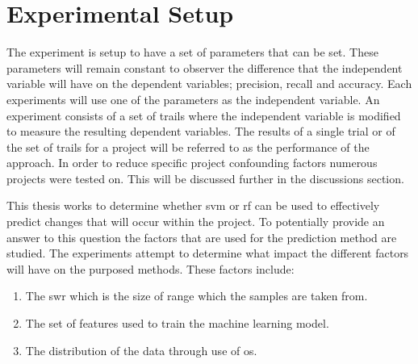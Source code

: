 





\section{Experimental Setup}


The experiment is setup to have a set of parameters that can be set. These parameters will remain constant to observer the difference that the independent variable will have on the dependent variables; precision, recall and accuracy. Each experiments will use one of the parameters as the independent variable. An experiment consists of a set of trails where the independent variable is modified to measure the resulting dependent variables. The results of a single trial or of the set of trails for a project will be referred to as the performance of the approach. In order to reduce specific project confounding factors numerous projects were tested on. This will be discussed further in the discussions section.

This thesis works to determine whether \gls{svm} or \gls{rf} can be used to effectively predict changes that will occur within the project. To potentially provide an answer to this question the factors that are used for the prediction method are studied. The experiments attempt to determine what impact the different factors will have on the purposed methods. These factors include:
\begin{enumerate}
\item The \gls{swr} which is the size of range which the samples are taken from.
\item The set of features used to train the machine learning model.
\item The distribution of the data through use of \gls{os}.
\end{enumerate}

